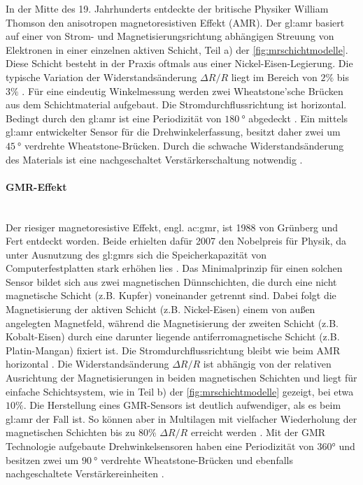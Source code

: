 In der Mitte des 19. Jahrhunderts entdeckte der britische Physiker William Thomson den anisotropen magnetoresistiven Effekt (AMR). Der \gls{gl:amr} basiert auf einer von Strom- und Magnetisierungsrichtung abhängigen Streuung von Elektronen in einer einzelnen aktiven Schicht, Teil a) der \autoref{fig:mrschichtmodelle}. Diese Schicht besteht in der Praxis oftmals aus einer Nickel-Eisen-Legierung. Die typische Variation der Widerstandsänderung $\Delta R/R$ liegt im Bereich von $2\%$ bis $3\%$ \cite{Tille2020}. Für eine eindeutig Winkelmessung werden zwei Wheatstone'sche Brücken aus dem Schichtmaterial aufgebaut. Die Stromdurchflussrichtung ist horizontal. Bedingt durch den \gls{gl:amr} ist eine Periodizität von $\SI{180}{\degree}$ abgedeckt \cite{Lemme2016}\cite{Tille2020}. Ein mittels \gls{gl:amr} entwickelter Sensor für die Drehwinkelerfassung, besitzt daher zwei um $\SI{45}{\degree}$ verdrehte Wheatstone-Brücken. Durch die schwache Widerstandsänderung des Materials ist eine nachgeschaltet Verstärkerschaltung notwendig \cite{NXPSemiconductors2014}.


\paragraph{GMR-Effekt}\label{par:GMR}$~$\\


Der riesiger magnetoresistive Effekt, engl. \gls{ac:gmr},  ist 1988 von Grünberg und Fert entdeckt worden. Beide erhielten dafür 2007 den Nobelpreis für Physik, da unter Ausnutzung des \gls{gl:gmr}s sich die Speicherkapazität von Computerfestplatten stark erhöhen lies \cite{Lemme2016}. Das Minimalprinzip für einen solchen Sensor bildet sich aus zwei magnetischen Dünnschichten, die durch eine nicht magnetische Schicht (z.B. Kupfer) voneinander getrennt sind. Dabei folgt die Magnetisierung der aktiven Schicht (z.B. Nickel-Eisen) einem von außen angelegten Magnetfeld, während die Magnetisierung der zweiten Schicht (z.B. Kobalt-Eisen) durch eine darunter liegende antiferromagnetische Schicht (z.B. Platin-Mangan) fixiert ist. Die Stromdurchflussrichtung bleibt wie beim AMR horizontal \cite{Lemme2016}\cite{Tille2020}. Die Widerstandsänderung $\Delta R/R$ ist abhängig von der relativen Ausrichtung der Magnetisierungen in beiden magnetischen Schichten und liegt für einfache Schichtsystem, wie in Teil b) der \autoref{fig:mrschichtmodelle} gezeigt, bei etwa $10\%$. Die Herstellung eines GMR-Sensors ist deutlich aufwendiger, als es beim \gls{gl:amr} der Fall ist. So können aber in Multilagen mit vielfacher Wiederholung der magnetischen Schichten bis zu
$80\%$ $\Delta R/R$ erreicht werden \cite{Tille2020}. Mit der GMR Technologie aufgebaute Drehwinkelsensoren haben eine Periodizität von 360° und besitzen zwei um $\SI{90}{\degree}$ verdrehte Wheatstone-Brücken und ebenfalls nachgeschaltete Verstärkereinheiten \cite{infineon2018}.


